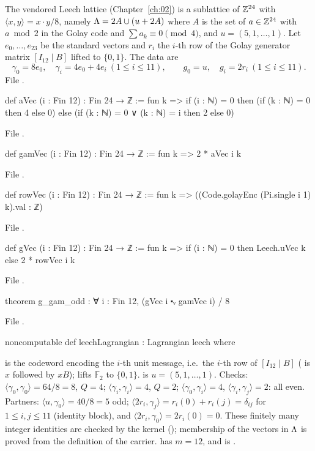 The vendored Leech lattice (Chapter~\ref{ch:02}) is a sublattice of ${\mathbb{Z}}^{24}$ with
$\langle x,y\rangle=x\cdot y/8$, namely ${\Lambda}=2A\cup(u+2A)$ where $A$ is the set of $a\in{\mathbb{Z}}^{24}$
with $a\bmod2$ in the Golay code and $\sum a_k\equiv0\pmod4$, and $u=(5,1,\dots,1)$.  Let
$e_0,\dots,e_{23}$ be the standard vectors and $r_i$ the $i$-th row of the Golay generator matrix
$[I_{12}\mid B]$ lifted to $\{0,1\}$.  The data are
\begin{equation*}
  \gamma_0=8e_0,\quad\gamma_i=4e_0+4e_i\ (1\le i\le11),\qquad g_0=u,\quad g_i=2r_i\ (1\le i\le 11).
\end{equation*}
\noindent File .
\begin{leancode}
def aVec (i : Fin 12) : Fin 24 → ℤ := fun k =>
  if (i : ℕ) = 0 then (if (k : ℕ) = 0 then 4 else 0)
  else (if (k : ℕ) = 0 ∨ (k : ℕ) = i then 2 else 0)
\end{leancode}
\noindent File .
\begin{leancode}
def gamVec (i : Fin 12) : Fin 24 → ℤ := fun k => 2 * aVec i k
\end{leancode}
\noindent File .
\begin{leancode}
def rowVec (i : Fin 12) : Fin 24 → ℤ := fun k => ((Code.golayEnc (Pi.single i 1) k).val : ℤ)
\end{leancode}
\noindent File .
\begin{leancode}
def gVec (i : Fin 12) : Fin 24 → ℤ := fun k =>
  if (i : ℕ) = 0 then Leech.uVec k else 2 * rowVec i k
\end{leancode}
\noindent File .
\begin{leancode}
theorem g_gam_odd : ∀ i : Fin 12, (gVec i ⬝ᵥ gamVec i) / 8 %
\end{leancode}
\noindent File .
\begin{leancode}
noncomputable def leechLagrangian : Lagrangian leech where
\end{leancode}
\begin{dictionary}
 is the codeword encoding the $i$-th unit message, i.e.\ the
$i$-th row of $[I_{12}\mid B]$ ( is $x$ followed by $xB$);  lifts
$\mathbb F_2$ to $\{0,1\}$.   is $u=(5,1,\dots,1)$.  Checks: $\langle\gamma_0,
\gamma_0\rangle=64/8=8$, $Q=4$; $\langle\gamma_i,\gamma_i\rangle=4$, $Q=2$; $\langle\gamma_0,
\gamma_i\rangle=4$, $\langle\gamma_i,\gamma_j\rangle=2$: all even.  Partners:
$\langle u,\gamma_0\rangle=40/8=5$ odd; $\langle2r_i,\gamma_j\rangle=r_i(0)+r_i(j)=\delta_{ij}$
for $1\le i,j\le11$ (identity block), and $\langle2r_i,\gamma_0\rangle=2r_i(0)=0$.  These finitely
many integer identities are checked by the kernel (); membership of the vectors
in ${\Lambda}$ is proved from the definition of the carrier.   has $m=12$, and
 is .
\end{dictionary}

